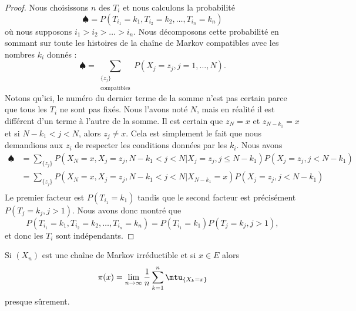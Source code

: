 \begin{proof}
    Nous choisissons \( n\) des \( T_i\) et nous calculons la probabilité
    \begin{equation}
        \spadesuit=P(T_{i_1}=k_1,T_{i_2}=k_2,\ldots,T_{i_n}=k_n)
    \end{equation}
    où nous supposons \( i_1>i_2>\ldots>i_n\). Nous décomposons cette probabilité en sommant sur toute les histoires de la chaîne de Markov compatibles avec les nombres \( k_i\) donnés :
    \begin{equation}
        \spadesuit=\sum_{\substack{\{ z_j \}\\\text{compatibles}}}P(X_j=z_j,j=1,\ldots,N).
    \end{equation}
    Notons qu'ici, le numéro du dernier terme de la somme n'est pas certain parce que tous les \( T_i\) ne sont pas fixés. Nous l'avons noté \( N\), mais en réalité il est différent d'un terme à l'autre de la somme. Il est certain que \( z_N=x\) et \( z_{N-k_1}=x\) et si \( N-k_1<j<N\), alors \( z_j\neq x\). Cela est simplement le fait que nous demandions aux \( z_i\) de respecter les conditions données par les \( k_i\). Nous avons
    \begin{subequations}
        \begin{align}
            \spadesuit&=\sum_{\{ z_j \}} P(X_N=x,X_j=z_j,N-k_1<j<N|X_j=z_j,j\leq N-k_1)P(X_j=z_j,j<N-k_1)\\
            &=\sum_{\{ z_j \}} P(X_N=x,X_j=z_j,N-k_1<j<N|X_{N-k_1}=x)P(X_j=z_j,j<N-k_1)\\
        \end{align}
    \end{subequations}
    Le premier facteur est \( P(T_{i_1}=k_1)\) tandis que le second facteur est précisément \( P(T_{j}=k_j,j>1)\). Nous avons donc montré que
    \begin{equation}
        P(T_{i_1}=k_1,T_{i_2}=k_2,\ldots,T_{i_n}=k_n)=P(T_{i_1}=k_1)P(T_{j}=k_j,j>1),
    \end{equation}
    et donc les \( T_i\) sont indépendants.
\end{proof}

\begin{proposition}     \label{PropjOjDux}
    Si \( (X_n)\) est une chaîne de Markov irréductible et si \( x\in E\) alors
    \begin{equation}        \label{EqPiEndempropropkeu}
        \pi(x)=\lim_{n\to \infty} \frac{1}{ n }\sum_{k=1}^n\mtu_{\{ X_k=x \}}
    \end{equation}
    presque sûrement.
\end{proposition}

